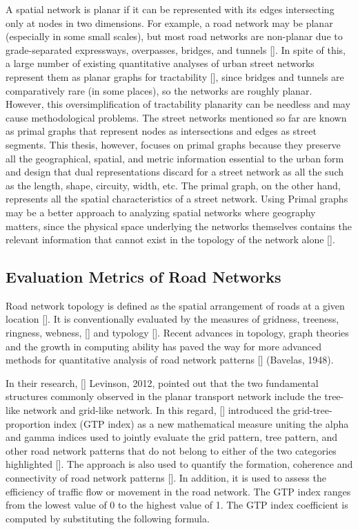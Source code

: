A spatial network is planar if it can be represented with its edges intersecting only at nodes in two dimensions. For example, a road network may be planar (especially in some small scales), but most road networks are non-planar due to grade-separated expressways, overpasses, bridges, and tunnels [\cite{Boeing:2017}]. In spite of this, a large number of existing quantitative analyses of urban street networks represent them as planar graphs for tractability [\cite{Barthelemy:2008, Buhl:2006,Cardillo:2006, Masucci:2009, Strano:2013}], since bridges and tunnels are comparatively rare (in some places), so the networks are roughly planar. However, this oversimplification of tractability planarity can be needless and may cause methodological problems. The street networks mentioned so far are known as primal graphs that represent nodes as intersections and edges as street segments. This thesis, however, focuses on primal graphs because they preserve all the geographical, spatial, and metric information essential to the urban form and design that dual representations discard for a  street network as all the such as the length, shape, circuity, width, etc. The primal graph, on the other hand, represents all the spatial characteristics of a street network. Using Primal graphs may be a better approach to analyzing spatial networks where geography matters, since the physical space underlying the networks themselves contains the relevant information that cannot exist in the topology of the network alone [\cite{Ratti:2004}].

\subsection{Evaluation Metrics of Road Networks}
Road network topology is defined as the spatial arrangement of roads at a given location [\cite{Rodrigue:2016}]. It is conventionally evaluated by the measures of gridness, treeness, ringness, webness, [\cite{Barthelemy:2011, Buhl:2006, Gudmundsson:2013, Xie:2007}] and typology [\cite{Louf:2014}]. Recent advances in topology, graph theories and the growth in computing ability has paved the way for more advanced methods for quantitative analysis of road network patterns [\cite{Jiang:2004, Cardillo:2006}] (Bavelas, 1948).

In their research, [\cite{Xie:2007}] Levinson, 2012, pointed out that the two fundamental structures commonly observed in the planar transport network include the tree-like network and grid-like network. In this regard, [\cite{Noda:1996}] introduced the grid-tree-proportion index (GTP index) as a new mathematical measure uniting the alpha and gamma indices used to jointly evaluate the grid pattern, tree pattern, and other road network patterns that do not belong to either of the two categories  highlighted [\cite{Usui:2011}]. The approach is also used to quantify the formation, coherence and connectivity of road network patterns [\cite{Gogoi:2013, Usui:2011, Wang:2017}]. In addition, it is used to assess the efficiency of traffic flow or movement in the road network. The GTP index ranges from the lowest value of 0 to the highest value of 1. The GTP index coefficient is computed by substituting the following formula.


